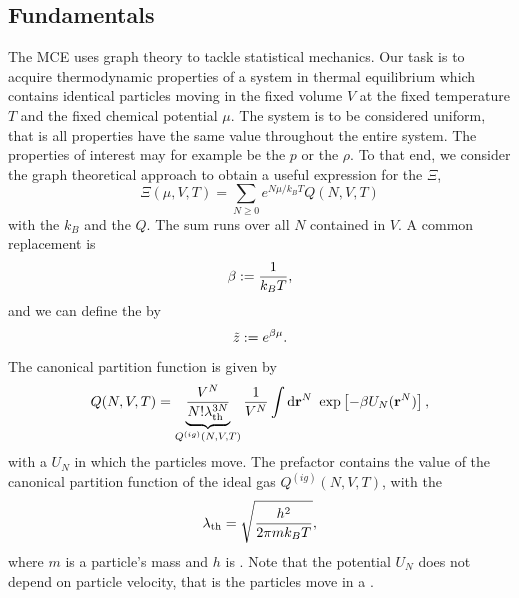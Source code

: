 \documentclass[8.5pt,twoside,twocolumn]{article}
\newcommand\di{\te{d}}
\newcommand\dr{\di\r}
\renewcommand\r{\bo r}
\theoremstyle{standard}
\begin{document}
\subsection{Fundamentals}
The MCE uses graph theory to tackle statistical mechanics. Our task is to
acquire thermodynamic properties of a system in thermal equilibrium which
contains identical particles moving in the fixed volume $V$ at the fixed
temperature $T$ and the fixed chemical potential $\mu$. The system is to be considered uniform, that is all properties have the same value throughout the entire system.
 The properties of interest may for example be the  $p$
or the  $\rho$. To that end, we consider the graph
theoretical approach to obtain a useful expression for the  $\Xi$,
\begin{equation}
\Xi(\mu,V,T)=\sum_{N\ge0} e^{N \mu/k_B T} Q(N,V,T)
\label{GrandCanonical}
\end{equation}
with %
the  $k_B$
and the  $Q$. The sum runs over all  $N$ contained in $V$.
A common replacement is
\begin{equation}
\beta:=\frac 1 {k_B T},
\end{equation}
and we can define the  by
\begin{equation}
\tilde z:=e^{\beta \mu}.
\label{fuga.1}
\end{equation}
The canonical partition function is given by
\begin{equation}
 \begin{aligned}
 Q(N,V,T)=\underbrace{\frac {V^N}{N!\la_\te{th}^{3N}}}_{Q^{(ig)}(N,V,T)} \frac 1 {V^N} \int \dr^N\ \exp\lt[-\be U_N(\r^N)\rt],
 \end{aligned}
\label{QNVT}
\end{equation}
with a  $U_N$ in which the particles move. The prefactor contains the value
of the canonical partition function of the ideal gas $Q^{(ig)}(N,V,T)$, with the 
\begin{equation}
\lambda_\text{th}=\sqrt{\frac {h^2} {2\pi mk_BT}},
\end{equation}
where $m$ is a particle's mass and $h$ is . Note that the potential $U_N$ does
not depend on particle velocity, that is the particles move in a . 
\end{document}
